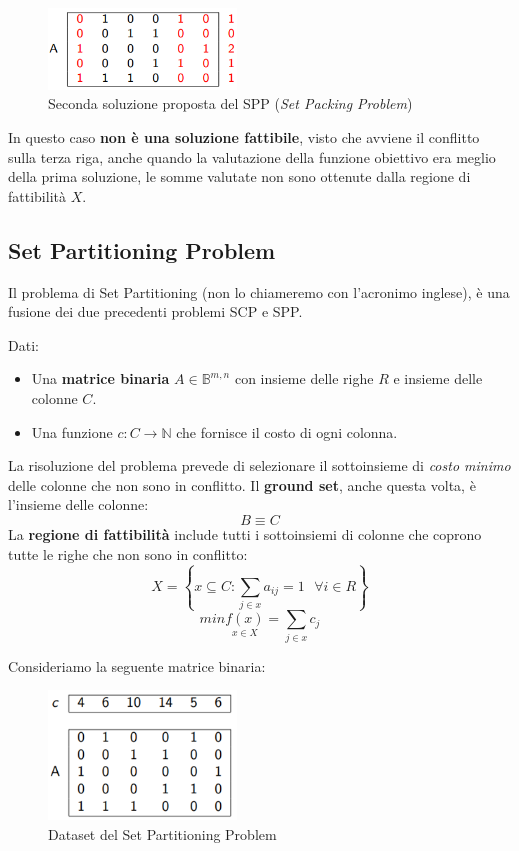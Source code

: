 \documentclass{article}
\begin{document}
\begin{figure}[H]
    \centering
    \includegraphics[width=5cm]{images/SPP_snd_sol.png}
    \caption{Seconda soluzione proposta del SPP (\textit{Set Packing Problem})}
    \label{fig:snd_sol_SPP}
\end{figure}
In questo caso \textbf{non è una soluzione fattibile}, visto che avviene il conflitto sulla terza riga, anche quando
la valutazione della funzione obiettivo era meglio della prima soluzione, le somme valutate non sono ottenute dalla
regione di fattibilità $X$.

\subsection{Set Partitioning Problem}
Il problema di Set Partitioning (non lo chiameremo con l'acronimo inglese), è una fusione dei due precedenti problemi
SCP e SPP.

Dati:
\begin{itemize}
    \item Una \textbf{matrice binaria} $A\in \mathbb{B}^{m,n}$ con insieme delle righe $R$ e insieme delle colonne
          $C$.
    \item Una funzione $c:C\rightarrow\mathbb{N}$ che fornisce il costo di ogni colonna.
\end{itemize}
La risoluzione del problema prevede di selezionare il sottoinsieme di \textit{costo minimo} delle colonne
che non sono in conflitto.
Il \textbf{ground set}, anche questa volta, è l'insieme delle colonne:
$$B\equiv C$$
La \textbf{regione di fattibilità} include tutti i sottoinsiemi di colonne che coprono tutte le righe che non
sono in conflitto:
$$X=\left\{x\subseteq C:\sum_{j\in x}a_{ij}=1 \text{ }\forall i \in R\right\}$$
$$min\underset{x\in X}{f(x)}=\sum_{j\in x}c_j$$

Consideriamo la seguente matrice binaria:

\begin{figure}[H]
    \centering
    \includegraphics[width=5cm]{images/SPP2_dataset.png}
    \caption{Dataset del Set Partitioning Problem}
    \label{fig:dataset_SPP2}
\end{figure}
\end{document}
